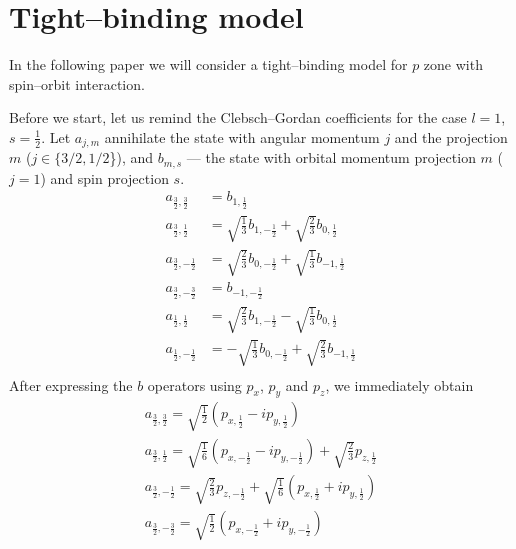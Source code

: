 \section{Tight--binding model}
In the following paper we will consider a tight--binding model for $p$ zone with spin--orbit
interaction.

Before we start, let us remind the Clebsch--Gordan coefficients for the case $l = 1$, 
$s = \frac{1}{2}$. Let $a_{j,m}$ annihilate the state with angular momentum $j$
and the projection $m$ ($j \in \{3/2, 1/2$\}), and $b_{m, s}$ --- the state with orbital
momentum projection $m$ ($j = 1$) and spin projection $s$.
\begin{equation}
	\begin{split}
		a_{\frac 32, \frac 32} &= b_{1,\frac 12}\\
		a_{\frac 32, \frac 12} &= \sqrt{\frac 13}b_{1, -\frac 12} 
		    + \sqrt{\frac 23} b_{0, \frac 12}\\
		a_{\frac 32, -\frac 12} &= \sqrt{\frac 23} b_{0, -\frac 12} +
		    	\sqrt{\frac 13}b_{-1, \frac 12} \\
		a_{\frac 32, -\frac 32} &= b_{-1,-\frac 12}\\
		a_{\frac 12, \frac 12} &= \sqrt{\frac 23} b_{1, -\frac 12} -
		    	\sqrt{\frac 13}b_{0, \frac 12} \\
		a_{\frac 12, -\frac 12} &= -\sqrt{\frac 13}b_{0, -\frac 12} 
			+ \sqrt{\frac 23} b_{-1, \frac 12}\\
	\end{split}
\end{equation}
After expressing the $b$ operators using $p_x$, $p_y$ and $p_z$, we immediately obtain
\begin{equation}
	\label{transform1}
	\begin{gathered}
		a_{\frac{3}{2}, \frac{3}{2}} = 
			\sqrt{\frac{1}{2}} \left(p_{x,\frac{1}{2}} - i p_{y,\frac{1}{2}}\right)\\
		a_{\frac{3}{2}, \frac{1}{2}} = 
			\sqrt{\frac{1}{6}} \left(p_{x,-\frac{1}{2}} - i p_{y,-\frac{1}{2}}\right) 
				+ \sqrt{\frac{2}{3}} p_{z, \frac{1}{2}}\\
		a_{\frac{3}{2}, -\frac{1}{2}} = 
			\sqrt{\frac{2}{3}} p_{z, -\frac{1}{2}}+
				\sqrt{\frac{1}{6}} \left(p_{x,\frac{1}{2}} + i p_{y,\frac{1}{2}}\right) \\
		a_{\frac{3}{2}, -\frac{3}{2}} = 
			\sqrt{\frac{1}{2}} \left(p_{x,-\frac{1}{2}} + i p_{y,-\frac{1}{2}}\right)\\
	\end{gathered}
\end{equation}
